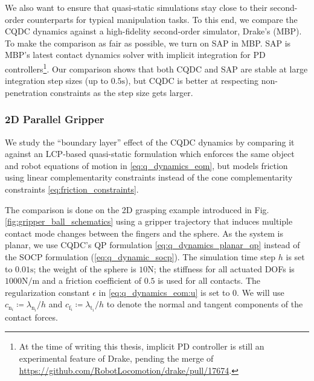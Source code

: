We also want to ensure that quasi-static simulations stay close to their second-order counterparts for typical manipulation tasks. To this end, we compare the CQDC dynamics against a high-fidelity second-order simulator, Drake's  (MBP). To make the comparison as fair as possible, we turn on SAP \cite{castro2021unconstrained} in MBP. SAP is MBP's latest contact dynamics solver with implicit integration for PD controllers\footnote{
At the time of writing this thesis, implicit PD controller is still an experimental feature of Drake, pending the merge of \url{https://github.com/RobotLocomotion/drake/pull/17674}.}. Our comparison shows that both CQDC and SAP are stable at large integration step sizes (up to $0.5\mathrm{s}$), but CQDC is better at respecting non-penetration constraints as the step size gets larger.


\subsubsection{2D Parallel Gripper}
We study the ``boundary layer'' effect of the CQDC dynamics by comparing it against an LCP-based quasi-static formulation \cite{pang2021convex} which enforces the same object and robot equations of motion in \eqref{eq:q_dynamics_eom}, but models friction using linear complementarity constraints \cite{stewart1996implicit} instead of the cone complementarity constraints \eqref{eq:friction_constraints}.

The comparison is done on the 2D grasping example introduced in Fig. \ref{fig:gripper_ball_schematics} using a gripper trajectory that induces multiple contact mode changes between the fingers and the sphere. As the system is planar, we use CQDC's QP formulation \eqref{eq:q_dynamics_planar_qp} instead of the SOCP formulation (\ref{eq:q_dynamic_socp}). The simulation time step $h$ is set to $0.01\mathrm{s}$; the weight of the sphere is $10\mathrm{N}$; the stiffness for all actuated DOFs is $1000 \mathrm{N / m}$ and a friction coefficient of $0.5$ is used for all contacts. The regularization constant $\epsilon$ in \eqref{eq:q_dynamics_eom:u} is set to 0. We will use $c_{\mathrm{n}_i} \coloneqq \lambda_{\mathrm{n}_i} / h$ and $c_{\mathrm{f}_i} \coloneqq \lambda_{\mathrm{t}_i} / h$ to denote the normal and tangent components of the contact forces.

